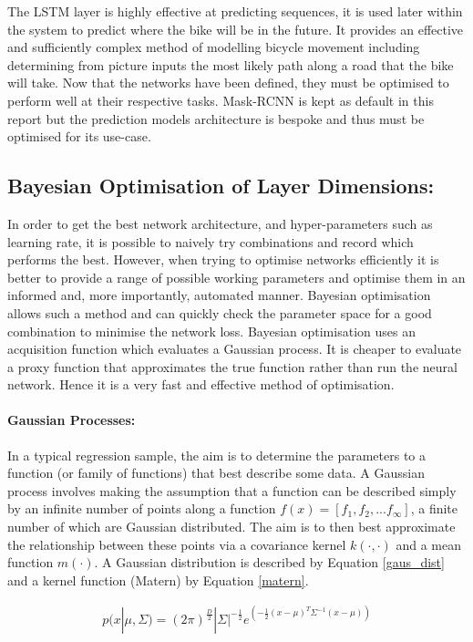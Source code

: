 \documentclass[11pt,twoside]{report}
\begin{document}
The LSTM layer is highly effective at predicting sequences, it is used later within the system to predict where the bike will be in the future. It provides an effective and sufficiently complex method of modelling bicycle movement including determining from picture inputs the most likely path along a road that the bike will take. Now that the networks have been defined, they must be optimised to perform well at their respective tasks. Mask-RCNN is kept as default in this report but the prediction models architecture is bespoke and thus must be optimised for its use-case.
 
\subsection{Bayesian Optimisation of Layer Dimensions:}
In order to get the best network architecture, and hyper-parameters such as learning rate, it is possible to naively try combinations and record which performs the best. However, when trying to optimise networks efficiently it is better to provide a range of possible working parameters and optimise them in an informed and, more importantly, automated manner. Bayesian optimisation allows such a method and can quickly check the parameter space for a good combination to minimise the network loss. Bayesian optimisation uses an acquisition function which evaluates a Gaussian process. It is cheaper to evaluate a proxy function that approximates the true function rather than run the neural network. Hence it is a very fast and effective method of optimisation.

\paragraph{Gaussian Processes:}
In a typical regression sample, the aim is to determine the parameters to a function (or family of functions) that best describe some data. A Gaussian process involves making the assumption that a function can be described simply by an infinite number of points along a function $f(x) = [f_{1},f_{2},...f_{\infty}]$, a finite number of which are Gaussian distributed. The aim is to then best approximate the relationship between these points via a covariance kernel $k(\cdot,\cdot)$ and a mean function $m(\cdot)$. A Gaussian distribution is described by Equation \ref{gaus_dist} and a kernel function (Matern) by Equation \ref{matern}.

\begin{equation}
\begin{aligned}
p(x|\mu,\Sigma) = (2 \pi)^{\frac{D}{2}} | \Sigma|^{- \frac{1}{2}} e^{(- \frac{1}{2}(x- \mu)^{T} \Sigma^{-1}(x- \mu))}
\end{aligned}
\label{gaus_dist}
\end{equation}
\end{document}
